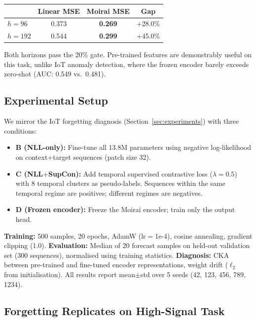 \begin{center}
\small
\begin{tabular}{lccc}
\toprule
& Linear MSE & Moirai MSE & Gap \\
\midrule
$h=96$  & 0.373 & \textbf{0.269} & $+$28.0\% \\
$h=192$ & 0.544 & \textbf{0.299} & $+$45.0\% \\
\bottomrule
\end{tabular}
\end{center}

Both horizons pass the 20\% gate.
Pre-trained features are demonstrably useful on this task, unlike
IoT anomaly detection, where the frozen encoder barely exceeds
zero-shot (AUC: 0.549 vs.\ 0.481).

\subsection{Experimental Setup}
\label{sec:forecasting:setup}

We mirror the IoT forgetting diagnosis (Section~\ref{sec:experiments})
with three conditions:

\begin{itemize}
\item \textbf{B (NLL-only):} Fine-tune all 13.8M parameters using
  negative log-likelihood on context$+$target sequences (patch size 32).
\item \textbf{C (NLL$+$SupCon):} Add temporal supervised contrastive
  loss ($\lambda{=}0.5$) with 8 temporal clusters as pseudo-labels.
  Sequences within the same temporal regime are positives; different
  regimes are negatives.
\item \textbf{D (Frozen encoder):} Freeze the Moirai encoder;
  train only the output head.
\end{itemize}

\textbf{Training:} 500 samples, 20 epochs, AdamW (lr$=$1e-4),
cosine annealing, gradient clipping (1.0).
\textbf{Evaluation:} Median of 20 forecast samples on held-out
validation set (300 sequences), normalised using training statistics.
\textbf{Diagnosis:} CKA between pre-trained and fine-tuned encoder
representations, weight drift ($\ell_2$ from initialisation).
All results report mean$\pm$std over 5 seeds
(42, 123, 456, 789, 1234).

\subsection{Forgetting Replicates on High-Signal Task}
\label{sec:forecasting:results}


